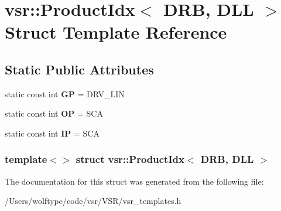 \hypertarget{structvsr_1_1_product_idx_3_01_d_r_b_00_01_d_l_l_01_4}{\section{vsr\-:\-:Product\-Idx$<$ D\-R\-B, D\-L\-L $>$ Struct Template Reference}
\label{structvsr_1_1_product_idx_3_01_d_r_b_00_01_d_l_l_01_4}
}
\subsection*{Static Public Attributes}
\begin{DoxyCompactItemize}
\item 
\hypertarget{structvsr_1_1_product_idx_3_01_d_r_b_00_01_d_l_l_01_4_a5663368535f77fa61e288d5cc20cb03f}{static const int {\bfseries G\-P} = D\-R\-V\-\_\-\-L\-I\-N}\label{structvsr_1_1_product_idx_3_01_d_r_b_00_01_d_l_l_01_4_a5663368535f77fa61e288d5cc20cb03f}

\item 
\hypertarget{structvsr_1_1_product_idx_3_01_d_r_b_00_01_d_l_l_01_4_a4fb29718268a8afd22f5961a63b837cb}{static const int {\bfseries O\-P} = S\-C\-A}\label{structvsr_1_1_product_idx_3_01_d_r_b_00_01_d_l_l_01_4_a4fb29718268a8afd22f5961a63b837cb}

\item 
\hypertarget{structvsr_1_1_product_idx_3_01_d_r_b_00_01_d_l_l_01_4_aeb3236edd1db5dbd405bcb76dee4346a}{static const int {\bfseries I\-P} = S\-C\-A}\label{structvsr_1_1_product_idx_3_01_d_r_b_00_01_d_l_l_01_4_aeb3236edd1db5dbd405bcb76dee4346a}

\end{DoxyCompactItemize}
\subsubsection*{template$<$$>$ struct vsr\-::\-Product\-Idx$<$ D\-R\-B, D\-L\-L $>$}



The documentation for this struct was generated from the following file\-:\begin{DoxyCompactItemize}
\item 
/\-Users/wolftype/code/vsr/\-V\-S\-R/vsr\-\_\-templates.\-h\end{DoxyCompactItemize}
